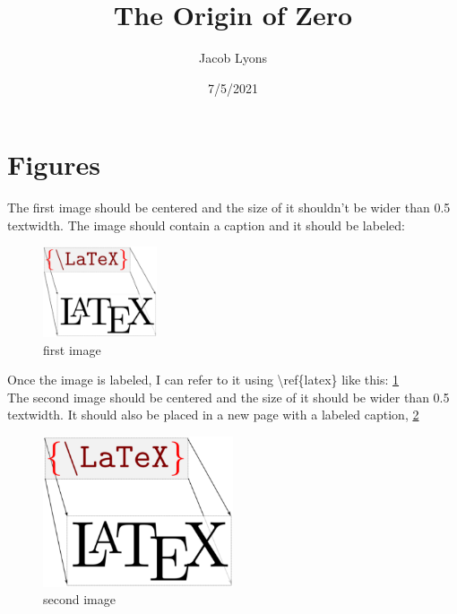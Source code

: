 \documentclass{article}
\title{The Origin of Zero}
\author{Jacob Lyons}
\date{7/5/2021}
\newcounter{newc}
\newenvironment{new environment}[1]
{\begin{center}
		#1\vspace{0.1in}\\
		\begin{tabular}{|p{0.9\textwidth}|}
			\hline\\
		}
		{ 
			\\\\\hline
		\end{tabular} 
	\end{center}
}
\newcounter{ex}[section]
\newenvironment{counter environment}[1]
{
	{\refstepcounter{ex}}
	\begin{center}
		#1\vspace{0.1in}\\
		\begin{tabular}{|p{0.9\textwidth}|}
			\hline\\
		}
		{ 
			\\\\\hline
		\end{tabular} 
	\end{center}
}
\newenvironment{last environment}[1]
{
	{\refstepcounter{ex}}
	\begin{center}
		\textbf{New envirionment \theex.}
		#1\vspace{0.1in}\\
		\begin{tabular}{|p{0.9\textwidth}|}
			\hline\\
		}
		{ 
			\\\\\hline
		\end{tabular} 
	\end{center}
}
\begin{document}
	
	\maketitle
	
	\section{Figures}
	The first image should be centered and the size of it shouldn’t be wider than 0.5 textwidth. The image should
	contain a caption and it should be labeled:	\\
	
	\begin{figure}[h] %
		\centering %
		\includegraphics[width=0.3\textwidth]{tex} %
		\caption{\label{latex}first image}
	\end{figure}

\noindent Once the image is labeled, I can refer to it using \textbackslash ref\{latex\} like this: \ref{latex}	\\

\noindent The second image should be centered and the size of it should be wider than 0.5 textwidth. It should also be placed in a new page with a labeled caption, \ref{latex2}

	
	\begin{figure}[p] %
		\centering %
		\includegraphics[width=0.5\textwidth]{tex}
		\caption{\label{latex2}second image}	
	\end{figure} 
\end{document}
